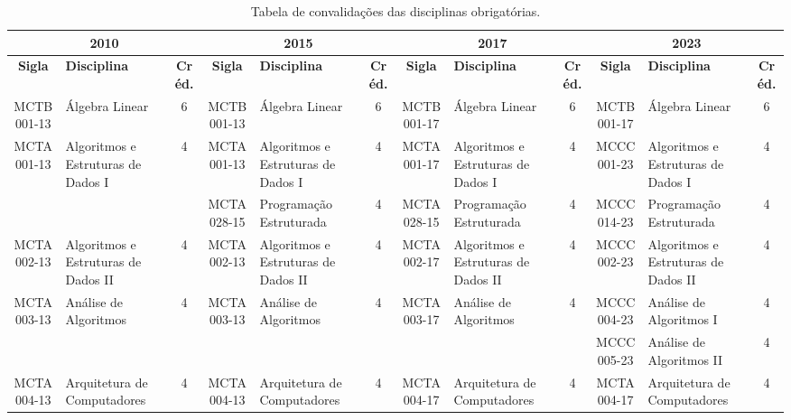 \documentclass[a4paper]{article}
\begin{document}
\begin{landscape}
{\footnotesize
\begin{longtable}{|c|p{.2\textheight}|c||c|p{.2\textheight}|c||c|p{.2\textheight}|c||c|p{.2\textheight}|c|}
    \caption{Tabela de convalidações das disciplinas obrigatórias.}
    \label{tab:convalidacoes_obrigatorias} \\

    \hline
    \multicolumn{3}{|c||}{\bf 2010} & \multicolumn{3}{|c|}{\bf 2015} &
    \multicolumn{3}{|c||}{\bf 2017} & \multicolumn{3}{|c|}{\bf 2023} \\ 
    \hline
    
    \textbf{Sigla} & \textbf{Disciplina} & \textbf{Créd.} & \textbf{Sigla} & \textbf{Disciplina} & \textbf{Créd.} &
    \textbf{Sigla} & \textbf{Disciplina} & \textbf{Créd.} & \textbf{Sigla} & \textbf{Disciplina} & \textbf{Créd.} \\
    \hline\hline
    
    MCTB001-13 & Álgebra Linear & 6 &
    MCTB001-13 & Álgebra Linear & 6 &
    MCTB001-17 & Álgebra Linear & 6 &
    MCTB001-17 & Álgebra Linear & 6 \\ \hline

    MCTA001-13 & Algoritmos e Estruturas de Dados I & 4 &
    MCTA001-13 & Algoritmos e Estruturas de Dados I & 4 & 
    MCTA001-17 & Algoritmos e Estruturas de Dados I & 4 & 
    MCCC001-23 & Algoritmos e Estruturas de Dados I & 4 \\

    & & &
    MCTA028-15 & Programação Estruturada & 4 &
    MCTA028-15 & Programação Estruturada & 4 &
    MCCC014-23 & Programação Estruturada & 4 \\ \hline

    MCTA002-13 & Algoritmos e Estruturas de Dados II & 4 &
    MCTA002-13 & Algoritmos e Estruturas de Dados II & 4 & 
    MCTA002-17 & Algoritmos e Estruturas de Dados II & 4 & 
    MCCC002-23 & Algoritmos e Estruturas de Dados II & 4 \\ \hline

    MCTA003-13 & Análise de Algoritmos & 4 &
    MCTA003-13 & Análise de Algoritmos & 4 &
    MCTA003-17 & Análise de Algoritmos & 4 & 
    MCCC004-23 & Análise de Algoritmos I & 4 \\

    & & &
    & & &
    & & &
    MCCC005-23 & Análise de Algoritmos II & 4 \\ \hline

    MCTA004-13 & Arquitetura de Computadores & 4 &
    MCTA004-13 & Arquitetura de Computadores & 4 &
    MCTA004-17 & Arquitetura de Computadores & 4 &
    MCTA004-17 & Arquitetura de Computadores & 4 \\ \hline


\end{longtable}}
\end{landscape}
\end{document}
